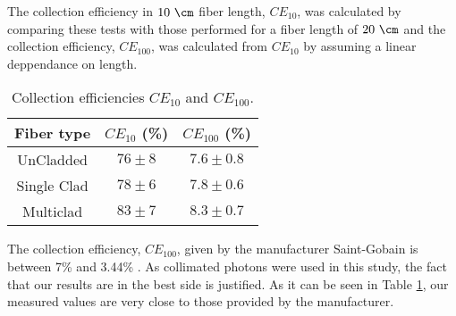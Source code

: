 


The collection efficiency in $10~\cm$ fiber length, $CE_{10}$, was calculated by comparing these tests with those performed for a fiber length of $20~\cm$ and the collection efficiency, $CE_{100}$, was calculated from $CE_{10}$ by assuming a linear deppendance on length.

\begin{table}[htbp]
\begin{center}
\begin{tabular}{|c|c|c|}
\hline
Fiber type & $CE_{10}$ (\%) & $CE_{100}$ (\%) \\\hline \hline \hline
UnCladded & $76 \pm 8$ & $7.6 \pm 0.8$ \\ \hline
Single Clad & $78 \pm 6$ & $7.8 \pm 0.6$ \\ \hline
Multiclad & $83 \pm 7$ & $8.3 \pm 0.7$ \\ \hline
\end{tabular}
\caption{Collection efficiencies $CE_{10}$ and $CE_{100}$.}
\label{tab:CollectionEfficiencyOfFibers}
\end{center}
\end{table}


The collection efficiency, $CE_{100}$, given by the manufacturer Saint-Gobain is between 7\% and 3.44\% \cite{DataSheetBCF12Fiber}. As collimated photons were used in this study, the fact that our results are in the best side is justified. As it can be seen in Table \ref{tab:CollectionEfficiencyOfFibers}, our measured values are very close to those provided by the manufacturer. %